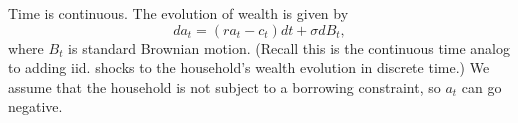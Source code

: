 \documentclass[11pt]{extarticle}
\theoremstyle{plain}
\theoremstyle{definition}
\begin{document}
% 
% 


Time is continuous. The evolution of wealth is given by 
\begin{equation*}
	da_t = (ra_t - c_t) dt + \sigma dB_t,
\end{equation*}
where $B_t$ is standard Brownian motion. (Recall this is the continuous time analog to adding iid. shocks to the household's wealth evolution in discrete time.) We assume that the household is not subject to a borrowing constraint, so $a_t$ can go negative. 
\end{document}
